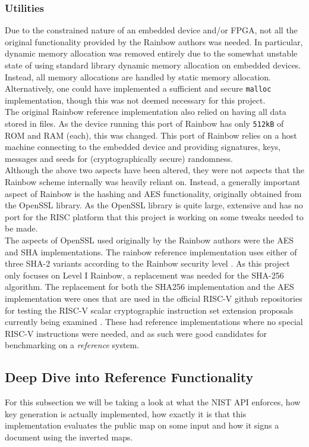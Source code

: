 \subsubsection{Utilities} \label{utils}
Due to the constrained nature of an embedded device and/or FPGA, not all the original functionality provided by the Rainbow authors was needed. In particular, dynamic memory allocation was removed entirely due to the somewhat unstable state of using standard library dynamic memory allocation on embedded devices. Instead, all memory allocations are handled by static memory allocation. Alternatively, one could have implemented a sufficient and secure \texttt{malloc} implementation, though this was not deemed necessary for this project.
\medskip\\
The original Rainbow reference implementation also relied on having all data stored in files. As the device running this port of Rainbow has only \texttt{512kB} of ROM and RAM (each), this was changed. This port of Rainbow relies on a host machine connecting to the embedded device and providing signatures, keys, messages and seeds for (cryptographically secure) randomness.
\medskip\\
Although the above two aspects have been altered, they were not aspects that the Rainbow scheme internally was heavily reliant on. Instead, a generally important aspect of Rainbow is the hashing and AES functionality, originally obtained from the OpenSSL library. As the OpenSSL library is quite large, extensive and has no port for the RISC platform that this project is working on some tweaks needed to be made.
\medskip\\
The aspects of OpenSSL used originally by the Rainbow authors were the AES and SHA implementations. The rainbow reference implementation uses either of three SHA-2 variants according to the Rainbow security level \cite{rainbownist}. As this project only focuses on Level I Rainbow, a replacement was needed for the SHA-256 algorithm. The replacement for both the SHA256 implementation and the AES implementation were ones that are used in the official RISC-V github repositories for testing the RISC-V scalar cryptographic instruction set extension proposals currently being examined \cite{riscvcrypt}. These had reference implementations where no special RISC-V instructions were needed, and as such were good candidates for benchmarking on a \textit{reference} system.

\subsection{Deep Dive into Reference Functionality} \label{deepdive}
For this subsection we will be taking a look at what the NIST API enforces, how key generation is actually implemented, how exactly it is that this implementation evaluates the public map on some input and how it signs a document using the inverted maps.
